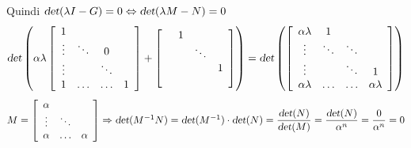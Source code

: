 \documentclass[10pt]{book}
\begin{document}
Quindi $\textsl{det}(\lambda I - G) = 0 \Leftrightarrow \textsl{det}(\lambda M - N) = 0$
$$\textsl{det}\left(\alpha\lambda\left[\begin{array}{c c c c}
1 &  & & \\
\vdots & \ddots & 0\\
\vdots & & \ddots & \\
1 & \ldots & \ldots & 1
\end{array}\right] + \left[\begin{array}{c c c c}
 & 1 & & \\
 &  &\ddots   \\
 & &  & 1 \\
 &  &  & 
\end{array}\right]\right) = \textsl{det}\left(\left[\begin{array}{c c c c}
\alpha\lambda & 1  & & \\
\vdots & \ddots & \ddots\\
\vdots & & \ddots & 1\\
\alpha\lambda & \ldots & \ldots & \alpha\lambda
\end{array}\right]\right)$$
$M = \left[\begin{array}{c c c}
\alpha\\
\vdots & \ddots\\
\alpha & \ldots & \alpha
\end{array}\right] \Rightarrow \textsl{det}(M^{-1}N) = \textsl{det}(M^{-1})\cdot\textsl{det}(N) = \mathlarger{\frac{\textsl{det}(N)}{\textsl{det}(M)}} = \mathlarger{\frac{\textsl{det}(N)}{\alpha^n}} = \mathlarger{\frac{0}{\alpha^n}} = 0$
\pagebreak
\end{document}
